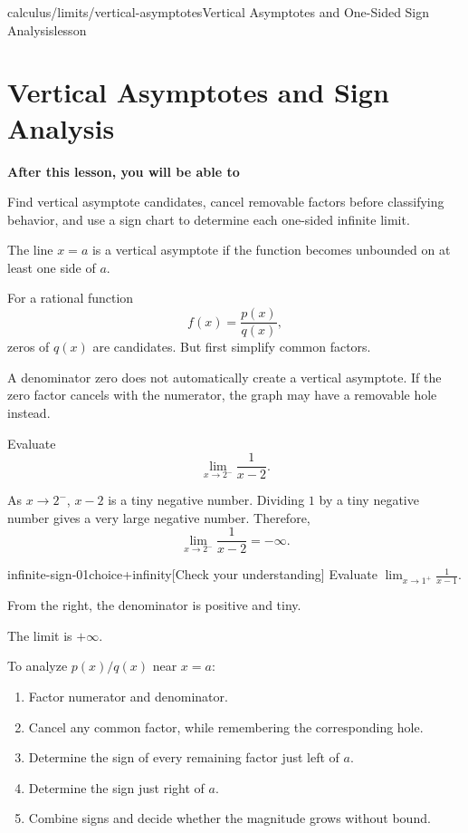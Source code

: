 \documentclass[11pt,openany]{book}
\theoremstyle{bgplain}
\newcounter{bgcheck}[section]
\newcommand{\lessonobjective}[1]{%
  \par\Needspace{4\baselineskip}\addvspace{0.6em}%
  {\bfseries\color{BGInk}After this lesson, you will be able to}\par\smallskip
  #1\par\addvspace{0.5em}%
}
\begin{document}
\begin{webpage}{calculus/limits/vertical-asymptotes}{Vertical Asymptotes and One-Sided Sign Analysis}{lesson}
\section{Vertical Asymptotes and Sign Analysis}

\lessonobjective{
Find vertical asymptote candidates, cancel removable factors before classifying behavior, and use a sign chart to determine each one-sided infinite limit.
}

The line \(x=a\) is a vertical asymptote if the function becomes unbounded on at least one side of \(a\).

For a rational function
\[
  f(x)=\frac{p(x)}{q(x)},
\]
zeros of \(q(x)\) are candidates. But first simplify common factors.

\begin{bgmistake}
A denominator zero does not automatically create a vertical asymptote. If the zero factor cancels with the numerator, the graph may have a removable hole instead.
\end{bgmistake}

\begin{bgguided}[title={Identify the sign before saying infinity}]
Evaluate
\[
  \lim_{x\to2^-}\frac1{x-2}.
\]

\begin{bgsolution}
As \(x\to2^-\), \(x-2\) is a tiny negative number. Dividing \(1\) by a tiny negative number gives a very large negative number. Therefore,
\[
  \boxed{\lim_{x\to2^-}\frac1{x-2}=-\infty}.
\]
\end{bgsolution}
\end{bgguided}


\begin{bgcheck}{infinite-sign-01}{choice}{+infinity}[Check your understanding]
Evaluate \(\lim_{x\to1^+}\frac1{x-1}\).
\begin{bghint}
From the right, the denominator is positive and tiny.
\end{bghint}
\begin{bgreveal}
The limit is \(+\infty\).
\end{bgreveal}
\end{bgcheck}



\begin{bgmethod}[title={One-Sided Sign Chart}]
To analyze \(p(x)/q(x)\) near \(x=a\):
\begin{enumerate}
  \item Factor numerator and denominator.
  \item Cancel any common factor, while remembering the corresponding hole.
  \item Determine the sign of every remaining factor just left of \(a\).
  \item Determine the sign just right of \(a\).
  \item Combine signs and decide whether the magnitude grows without bound.
\end{enumerate}
\end{bgmethod}


\end{webpage}
\end{document}
